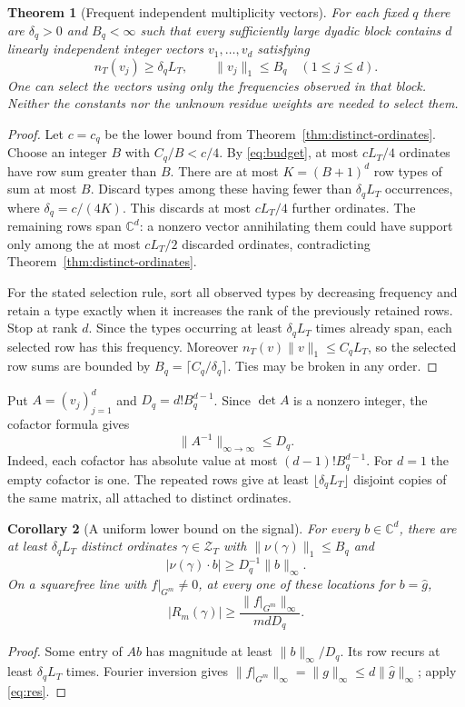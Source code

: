 \documentclass[11pt]{article}
\newtheorem{theorem}{Theorem}
\newtheorem{corollary}[theorem]{Corollary}
\newcommand{\C}{\mathbb C}
\begin{document}
\begin{theorem}[Frequent independent multiplicity vectors]\label{thm:bases}
For each fixed $q$ there are $\delta_q>0$ and $B_q<\infty$ such that every sufficiently large dyadic block contains $d$ linearly independent integer vectors $v_1,\dots,v_d$ satisfying
\[
 n_T(v_j)\ge\delta_q L_T,\qquad \|v_j\|_1\le B_q\quad (1\le j\le d).
\]
One can select the vectors using only the frequencies observed in that block. Neither the constants nor the unknown residue weights are needed to select them.
\end{theorem}
\begin{proof}
Let $c=c_q$ be the lower bound from Theorem~\ref{thm:distinct-ordinates}. Choose an integer $B$ with $C_q/B<c/4$. By \eqref{eq:budget}, at most $cL_T/4$ ordinates have row sum greater than $B$. There are at most $K=(B+1)^d$ row types of sum at most $B$. Discard types among these having fewer than $\delta_q L_T$ occurrences, where $\delta_q=c/(4K)$. This discards at most $cL_T/4$ further ordinates. The remaining rows span $\C^d$: a nonzero vector annihilating them could have support only among the at most $cL_T/2$ discarded ordinates, contradicting Theorem~\ref{thm:distinct-ordinates}.

For the stated selection rule, sort all observed types by decreasing frequency and retain a type exactly when it increases the rank of the previously retained rows. Stop at rank $d$. Since the types occurring at least $\delta_q L_T$ times already span, each selected row has this frequency. Moreover $n_T(v)\|v\|_1\le C_q L_T$, so the selected row sums are bounded by $B_q=\lceil C_q/\delta_q\rceil$. Ties may be broken in any order.
\end{proof}

Put $A=(v_j)_{j=1}^d$ and $D_q=d! B_q^{d-1}$. Since $\det A$ is a nonzero integer, the cofactor formula gives
\begin{equation}\label{eq:inverse}
 \|A^{-1}\|_{\infty\to\infty}\le D_q .
\end{equation}
Indeed, each cofactor has absolute value at most $(d-1)!B_q^{d-1}$. For $d=1$ the empty cofactor is one. The repeated rows give at least $\lfloor\delta_q L_T\rfloor$ disjoint copies of the same matrix, all attached to distinct ordinates.

\begin{corollary}[A uniform lower bound on the signal]\label{cor:large}
For every $b\in\C^d$, there are at least $\delta_q L_T$ distinct ordinates $\gamma\in\mathcal Z_T$ with $\|\nu(\gamma)\|_1\le B_q$ and
\[
 |\nu(\gamma)\cdot b|\ge D_q^{-1}\|b\|_\infty.
\]
On a squarefree line with $f|_{G^m}\ne0$, at every one of these locations for $b=\widehat g$,
\begin{equation}\label{eq:size}
 |R_m(\gamma)|\ge \frac{\|f|_{G^m}\|_\infty}{m d D_q}.
\end{equation}
\end{corollary}
\begin{proof}
Some entry of $Ab$ has magnitude at least $\|b\|_\infty/D_q$. Its row recurs at least $\delta_q L_T$ times. Fourier inversion gives $\|f|_{G^m}\|_\infty=\|g\|_\infty\le d\|\widehat g\|_\infty$; apply \eqref{eq:res}.
\end{proof}
\end{document}
